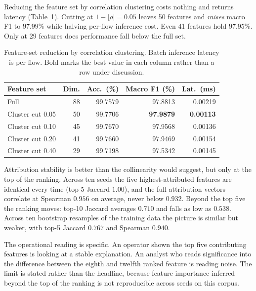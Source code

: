 \documentclass{ieeeaccess}
\begin{document}
Reducing the feature set by correlation clustering costs nothing and returns
latency (Table~\ref{tab:reduced}). Cutting at $1 - |\rho| = 0.05$ leaves 50
features and \emph{raises} macro F1 to $97.99\%$ while halving per-flow inference
cost. Even 41 features hold $97.95\%$. Only at 29 features does performance fall
below the full set.

\begin{table}[!t]
\caption{Feature-set reduction by correlation clustering. Batch inference latency is per flow. Bold marks the best value in each column rather than a row under discussion.}
\centering
\label{tab:reduced}
\footnotesize
\setlength{\tabcolsep}{4pt}
\renewcommand{\arraystretch}{1.2}
\begin{tabular}{@{}lrrrr@{}}
\toprule
\textbf{Feature set} & \textbf{Dim.} & \textbf{Acc.\ (\%)} & \textbf{Macro F1 (\%)} & \textbf{Lat.\ (ms)} \\
\midrule
Full                      & 88 & 99.7579 & 97.8813 & 0.00219 \\
Cluster cut 0.05          & 50 & 99.7706 & \textbf{97.9879} & \textbf{0.00113} \\
Cluster cut 0.10          & 45 & 99.7670 & 97.9568 & 0.00136 \\
Cluster cut 0.20          & 41 & 99.7660 & 97.9469 & 0.00154 \\
Cluster cut 0.40          & 29 & 99.7198 & 97.5342 & 0.00145 \\
\bottomrule
\end{tabular}
\end{table}

Attribution stability is better than the collinearity would suggest, but only at
the top of the ranking. Across ten seeds the five highest-attributed features are
identical every time (top-5 Jaccard $1.00$), and the full attribution vectors
correlate at Spearman $0.956$ on average, never below $0.932$. Beyond the top
five the ranking moves: top-10 Jaccard averages $0.710$ and falls as low as
$0.538$. Across ten bootstrap resamples of the training data the picture is
similar but weaker, with top-5 Jaccard $0.767$ and Spearman $0.940$.

The operational reading is specific. An operator shown the top five contributing
features is looking at a stable explanation. An analyst who reads significance
into the difference between the eighth and twelfth ranked feature is reading
noise. The limit is stated rather than the headline, because feature importance
inferred beyond the top of the ranking is not reproducible across seeds on
this corpus.
\end{document}
